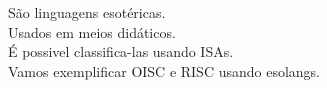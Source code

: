 \documentclass[preview]{standalone}
\begin{document}
São linguagens esotéricas.\\Usados em meios didáticos.\\É possivel classifica-las usando ISAs.\\Vamos exemplificar OISC e RISC usando esolangs.\\
\end{document}
